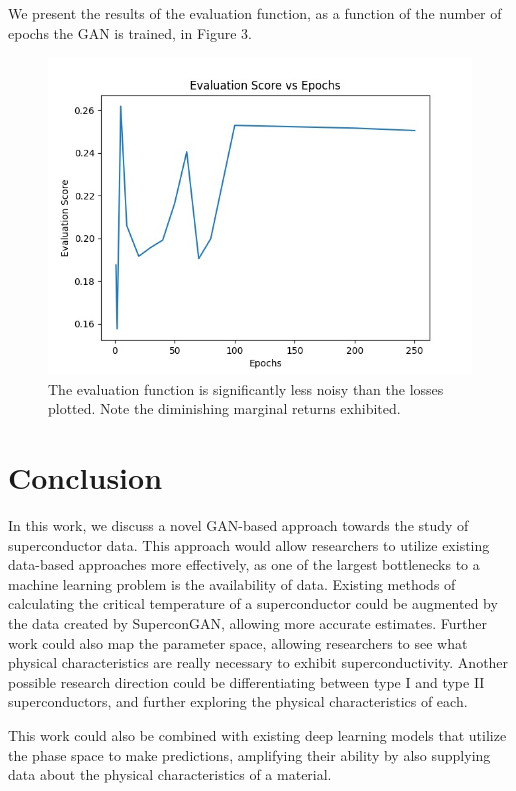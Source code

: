 \documentclass[11pt]{article}
\begin{document}
\newpage

We present the results of the evaluation function, as a function of the number of epochs the GAN is trained, in Figure 3.

\begin{figure}[H]
    \caption{The evaluation function is significantly less noisy than the losses plotted. Note the diminishing marginal returns exhibited.}
    \includegraphics{graph3}
    \centering
\end{figure}

\newpage

\section{Conclusion}
In this work, we discuss a novel GAN-based approach towards the study of superconductor data.
This approach would allow researchers to utilize existing data-based approaches more effectively, as one of the largest bottlenecks to a machine learning problem is the availability of data.
Existing methods of calculating the critical temperature of a superconductor could be augmented by the data created by SuperconGAN, allowing more accurate estimates.
Further work could also map the parameter space, allowing researchers to see what physical characteristics are really necessary to exhibit superconductivity.
Another possible research direction could be differentiating between type I and type II superconductors, and further exploring the physical characteristics of each.

This work could also be combined with existing deep learning models \cite{https://doi.org/10.1002/adma.202000953} that utilize the phase space to make predictions, amplifying their ability by also supplying data about the physical characteristics of a material.
\end{document}
